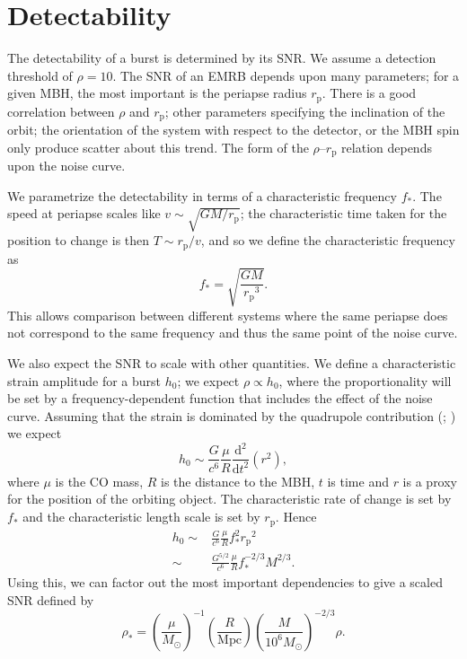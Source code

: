 \documentclass[useAMS,usedcolumn,usegraphicx,usenatbib]{mn2e}
\newcommand{\sub}[1]{\ensuremath{_\mathrm{#1}}}
\newcommand{\dd}{\ensuremath{\mathrm{d}}}
\begin{document}
\section{Detectability}\label{sec:SNR}

The detectability of a burst is determined by its SNR. We assume a detection threshold of $\rho = 10$. The SNR of an EMRB depends upon many parameters; for a given MBH, the most important is the periapse radius $r\sub{p}$. There is a good correlation between $\rho$ and $r\sub{p}$; other parameters specifying the inclination of the orbit; the orientation of the system with respect to the detector, or the MBH spin only produce scatter about this trend. The form of the $\rho$--$r\sub{p}$ relation depends upon the noise curve.

We parametrize the detectability in terms of a characteristic frequency $f_\ast$. The speed at periapse scales like $v \sim \sqrt{GM/r\sub{p}}$; the characteristic time taken for the position to change is then $T \sim r\sub{p}/v$, and so we define the characteristic frequency as
\begin{equation}
f_\ast = \sqrt{\frac{GM}{r\sub{p}^3}}.
\end{equation}
This allows comparison between different systems where the same periapse does not correspond to the same frequency and thus the same point of the noise curve.

We also expect the SNR to scale with other quantities. We define a characteristic strain amplitude for a burst $h_0$; we expect $\rho \propto h_0$, where the proportionality will be set by a frequency-dependent function that includes the effect of the noise curve. Assuming that the strain is dominated by the quadrupole contribution (\citealt*[section 36.10]{Misner1973}; \citealt*[section 17.9]{Hobson2006}) we expect
\begin{equation}
h_0 \sim \frac{G}{c^6}\frac{\mu}{R}\frac{\dd^2}{\dd t^2}\left(r^2\right),
\end{equation}
where $\mu$ is the CO mass, $R$ is the distance to the MBH, $t$ is time and $r$ is a proxy for the position of the orbiting object. The characteristic rate of change is set by $f_\ast$ and the characteristic length scale is set by $r\sub{p}$. Hence
\begin{align}
h_0 \sim {} & \frac{G}{c^6}\frac{\mu}{R}f_\ast^2 r\sub{p}^2 \\
 \sim {} & \frac{G^{5/2}}{c^6}\frac{\mu}{R}f_\ast^{-2/3}M^{2/3}.
\end{align}
Using this, we can factor out the most important dependencies to give a scaled SNR defined by
\begin{equation}
\rho_\ast = \left(\frac{\mu}{M_\odot}\right)^{-1}\left(\frac{R}{\mathrm{Mpc}}\right)\left(\frac{M}{10^6 M_\odot}\right)^{-2/3}\rho.
\label{eq:SNR-scaling}
\end{equation}
\end{document}
